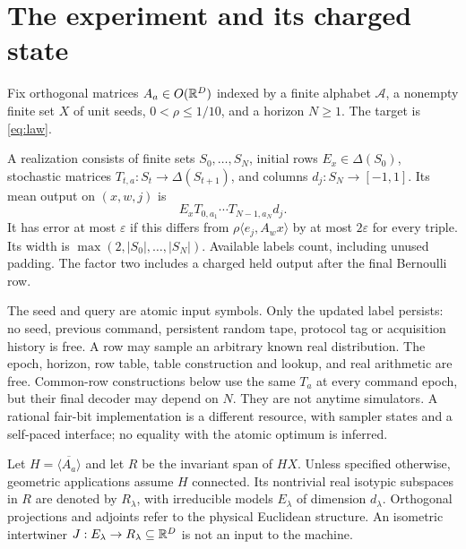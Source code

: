 \section{The experiment and its charged state}\label{sec:model}
Fix orthogonal matrices $A_a\in O(\mathbb R^D)$ indexed by a finite alphabet $\mathcal A$, a nonempty finite set $X$ of unit seeds, $0<\rho\le1/10$, and a horizon $N\ge1$. The target is \eqref{eq:law}.

\begin{definition}\label{def:machine}
A realization consists of finite sets $S_0,\ldots,S_N$, initial rows $E_x\in\Delta(S_0)$, stochastic matrices $T_{t,a}:S_t\to\Delta(S_{t+1})$, and columns $d_j:S_N\to[-1,1]$. Its mean output on $(x,w,j)$ is
\[
 E_xT_{0,a_1}\cdots T_{N-1,a_N}d_j.
\]
It has error at most $\varepsilon$ if this differs from $\rho\langle e_j,A_wx\rangle$ by at most $2\varepsilon$ for every triple. Its width is $\max(2,|S_0|,\ldots,|S_N|)$. Available labels count, including unused padding. The factor two includes a charged held output after the final Bernoulli row.
\end{definition}

The seed and query are atomic input symbols. Only the updated label persists: no seed, previous command, persistent random tape, protocol tag or acquisition history is free. A row may sample an arbitrary known real distribution. The epoch, horizon, row table, table construction and lookup, and real arithmetic are free. Common-row constructions below use the same $T_a$ at every command epoch, but their final decoder may depend on $N$. They are not anytime simulators. A rational fair-bit implementation is a different resource, with sampler states and a self-paced interface; no equality with the atomic optimum is inferred.

Let $H=\overline{\langle A_a\rangle}$ and let $R$ be the invariant span of $HX$. Unless specified otherwise, geometric applications assume $H$ connected. Its nontrivial real isotypic subspaces in $R$ are denoted by $R_\lambda$, with irreducible models $E_\lambda$ of dimension $d_\lambda$. Orthogonal projections and adjoints refer to the physical Euclidean structure. An isometric intertwiner $J:E_\lambda\to R_\lambda\subseteq\mathbb R^D$ is not an input to the machine.

